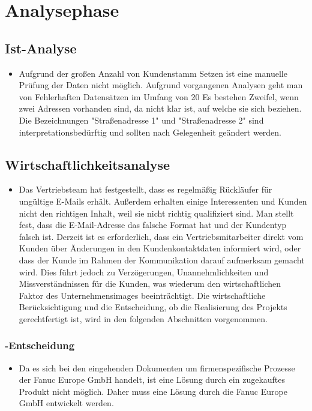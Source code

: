 \section{Analysephase} 
\label{sec:Analysephase}


\subsection{Ist-Analyse} 
\label{sec:IstAnalyse}
\begin{itemize}
	\item Aufgrund der großen Anzahl von Kundenstamm Setzen ist eine manuelle Prüfung der Daten nicht
	möglich. Aufgrund vorgangenen Analysen geht man von Fehlerhaften Datensätzen im Umfang von 20%
	Es bestehen Zweifel, wenn zwei Adressen vorhanden sind, da nicht klar ist, auf welche sie sich beziehen. 
	Die Bezeichnungen "Straßenadresse 1" und "Straßenadresse 2" sind interpretationsbedürftig und sollten nach Gelegenheit geändert werden. 
	
\end{itemize}


\subsection{Wirtschaftlichkeitsanalyse}
\label{sec:Wirtschaftlichkeitsanalyse}
\begin{itemize}
	\item Das Vertriebsteam hat festgestellt, dass es regelmäßig Rückläufer für ungültige E-Mails erhält. 
	Außerdem erhalten einige Interessenten und Kunden nicht den richtigen Inhalt, weil sie nicht richtig qualifiziert sind. 
	Man stellt fest, dass die E-Mail-Adresse das falsche Format hat und der Kundentyp falsch ist.
	Derzeit ist es erforderlich, dass ein Vertriebsmitarbeiter direkt vom Kunden über Änderungen in den Kundenkontaktdaten informiert wird, oder dass der Kunde im Rahmen der Kommunikation darauf aufmerksam gemacht wird.
	Dies führt jedoch zu Verzögerungen, Unannehmlichkeiten und Missverständnissen für die Kunden, was wiederum den wirtschaftlichen Faktor des Unternehmensimages beeinträchtigt.
	Die wirtschaftliche Berücksichtigung und die Entscheidung, ob die Realisierung des Projekts gerechtfertigt ist, wird in den folgenden Abschnitten vorgenommen.

\end{itemize}


\subsubsection{-Entscheidung}
\label{sec:MakeOrBuyEntscheidung}
\begin{itemize}
	\item Da es sich bei den eingehenden Dokumenten um firmenspezifische Prozesse der Fanuc Europe GmbH handelt, ist eine Lösung durch ein zugekauftes Produkt nicht möglich. 
	Daher muss eine Lösung durch die Fanuc Europe GmbH entwickelt werden.
\end{itemize}


